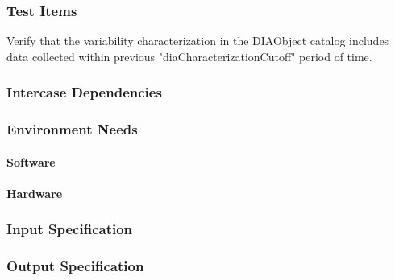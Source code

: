 \subsubsection{Test Items}
Verify that the variability characterization in the DIAObject catalog
includes data collected within previous "diaCharacterizationCutoff"
period of time.



\subsubsection{Intercase Dependencies}

\subsubsection{Environment Needs}

\paragraph{Software}

\paragraph{Hardware}

\subsubsection{Input Specification}

\subsubsection{Output Specification}

